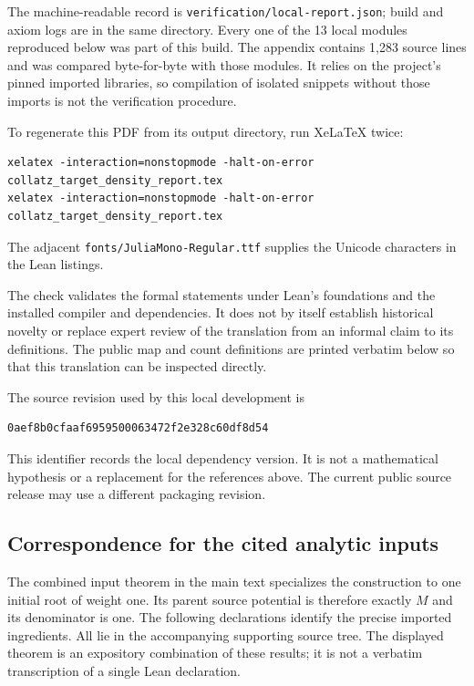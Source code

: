 \documentclass[11pt]{article}
\begin{document}
The machine-readable record is \texttt{verification/local-report.json};
build and axiom logs are in the same directory. Every one of the 13 local
modules reproduced below was part of this build. The appendix contains
1,283 source lines and was compared byte-for-byte with those modules.
It relies on the project's pinned imported libraries, so compilation of
isolated snippets without those imports is not the verification procedure.

To regenerate this PDF from its output directory, run XeLaTeX twice:
\begin{Verbatim}[breaklines=true]
xelatex -interaction=nonstopmode -halt-on-error collatz_target_density_report.tex
xelatex -interaction=nonstopmode -halt-on-error collatz_target_density_report.tex
\end{Verbatim}
The adjacent \texttt{fonts/JuliaMono-Regular.ttf} supplies the Unicode
characters in the Lean listings.

The check validates the formal statements under Lean's foundations and
the installed compiler and dependencies. It does not by itself establish
historical novelty or replace expert review of the translation from an
informal claim to its definitions. The public map and count definitions are
printed verbatim below so that this translation can be inspected directly.


The source revision used by this local development is
\begin{Verbatim}[fontsize=\small]
0aef8b0cfaaf6959500063472f2e328c60df8d54
\end{Verbatim}
This identifier records the local dependency version. It is not a
mathematical hypothesis or a replacement for the references above.
The current public source release may use a different packaging revision.

\subsection{Correspondence for the cited analytic inputs}
The combined input theorem in the main text specializes the construction
to one initial root of weight one. Its parent source potential is therefore
exactly $M$ and its denominator is one. The following declarations identify
the precise imported ingredients. All lie in the accompanying supporting
source tree. The displayed theorem is an expository combination of these
results; it is not a verbatim transcription of a single Lean declaration.
\end{document}
